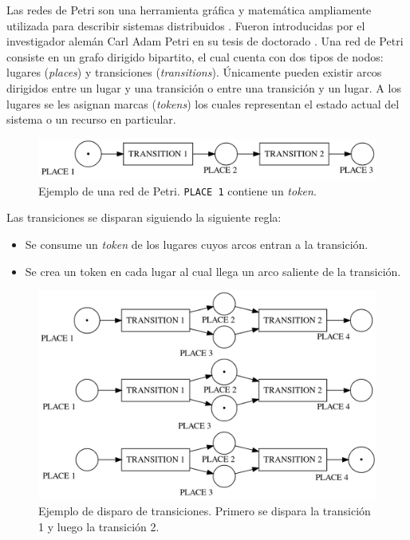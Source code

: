\documentclass[12pt]{article}
\begin{document}
Las redes de Petri son una herramienta gráfica y matemática ampliamente utilizada para describir sistemas distribuidos \cite{murata1989}.
Fueron introducidas por el investigador alemán Carl Adam Petri en su tesis de doctorado \cite{petri1962}.
Una red de Petri consiste en un grafo dirigido bipartito, el cual cuenta con dos tipos de nodos: lugares (\textit{places}) y transiciones (\textit{transitions}).
Únicamente pueden existir arcos dirigidos entre un lugar y una transición o entre una transición y un lugar.
A los lugares se les asignan marcas (\textit{tokens}) los cuales representan el estado actual del sistema o un recurso en particular.

\begin{figure}[H]
    \centering
    \includegraphics[scale=0.25]{petri-net-example.png}
    \caption{Ejemplo de una red de Petri. \texttt{PLACE 1} contiene un \textit{token}.}
\end{figure}

Las transiciones se disparan siguiendo la siguiente regla:
\begin{itemize}
    \item Se consume un \textit{token} de los lugares cuyos arcos entran a la transición.
    \item Se crea un token en cada lugar al cual llega un arco saliente de la transición.
\end{itemize}

\begin{figure}[H]
    \centering
    \includegraphics[scale=0.25]{petri-net-transition-firing-example.png}
    \caption{Ejemplo de disparo de transiciones. Primero se dispara la transición 1 y luego la transición 2.}
\end{figure}
\end{document}
